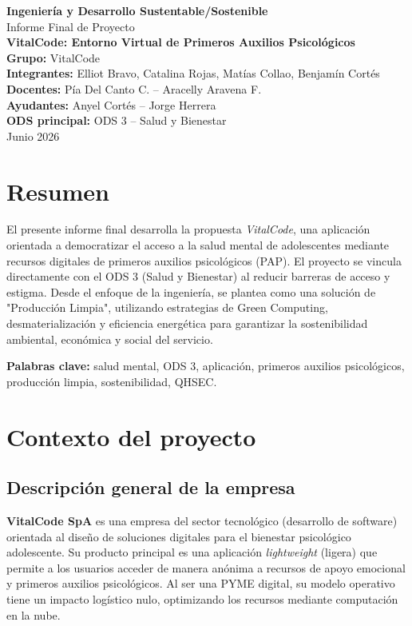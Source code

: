 \documentclass[12pt,letterpaper]{article}
\newcommand{\nombreProyecto}{VitalCode: Entorno Virtual de Primeros Auxilios Psicológicos}
\newcommand{\nombreCurso}{Ingeniería y Desarrollo Sustentable/Sostenible}
\newcommand{\docentes}{Pía Del Canto C. -- Aracelly Aravena F.}
\newcommand{\ayudantes}{Anyel Cortés -- Jorge Herrera}
\newcommand{\grupo}{VitalCode}
\newcommand{\integrantes}{Elliot Bravo, Catalina Rojas, Matías Collao, Benjamín Cortés}
\newcommand{\fecha}{Junio 2026}
\begin{document}
\begin{titlepage}
\centering
\vspace*{1cm}
{\Large \textbf{\nombreCurso}}\\[0.4cm]
{\large Informe Final de Proyecto}\\[1.5cm]
{\Huge \textbf{\nombreProyecto}}\\[1cm]
{\Large \textbf{Grupo:} \grupo}\\[0.4cm]
{\large \textbf{Integrantes:} \integrantes}\\[0.4cm]
{\large \textbf{Docentes:} \docentes}\\[0.2cm]
{\large \textbf{Ayudantes:} \ayudantes}\\[1cm]
{\large \textbf{ODS principal:} ODS 3 -- Salud y Bienestar}\\[2cm]
{\large \fecha}
\vfill
\end{titlepage}

\tableofcontents
\newpage

\section*{Resumen}
El presente informe final desarrolla la propuesta \textit{VitalCode}, una aplicación orientada a democratizar el acceso a la salud mental de adolescentes mediante recursos digitales de primeros auxilios psicológicos (PAP). El proyecto se vincula directamente con el ODS 3 (Salud y Bienestar) al reducir barreras de acceso y estigma. Desde el enfoque de la ingeniería, se plantea como una solución de "Producción Limpia", utilizando estrategias de Green Computing, desmaterialización y eficiencia energética para garantizar la sostenibilidad ambiental, económica y social del servicio.

\textbf{Palabras clave:} salud mental, ODS 3, aplicación, primeros auxilios psicológicos, producción limpia, sostenibilidad, QHSEC.

\newpage

\section{Contexto del proyecto}

\subsection{Descripción general de la empresa}
\textbf{VitalCode SpA} es una empresa del sector tecnológico (desarrollo de software) orientada al diseño de soluciones digitales para el bienestar psicológico adolescente. Su producto principal es una aplicación \textit{lightweight} (ligera) que permite a los usuarios acceder de manera anónima a recursos de apoyo emocional y primeros auxilios psicológicos. Al ser una PYME digital, su modelo operativo tiene un impacto logístico nulo, optimizando los recursos mediante computación en la nube.
\end{document}
